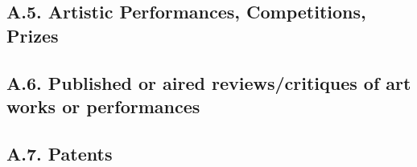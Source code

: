 \documentclass[12pt]{article}
\begin{document}
\subsection*{A.5. Artistic Performances, Competitions, Prizes}




\subsection*{A.6. Published or aired reviews/critiques of art works or performances}

\subsection*{A.7. Patents}
\end{document}
